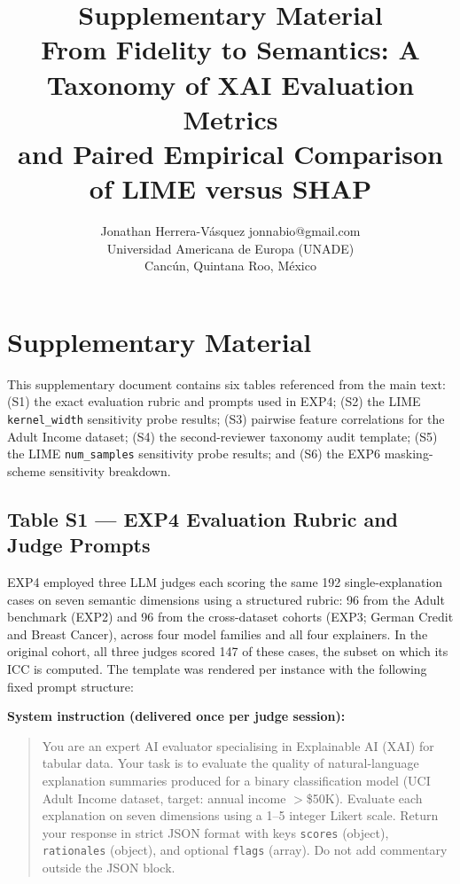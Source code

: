 \documentclass[10pt]{article}
\title{Supplementary Material\\
From Fidelity to Semantics: A Taxonomy of XAI Evaluation Metrics\\
and Paired Empirical Comparison of LIME versus SHAP}
\author{
\name Jonathan Herrera-V\'asquez \email jonnabio@gmail.com \\
\addr Universidad Americana de Europa (UNADE)\\
Canc\'un, Quintana Roo, M\'exico
}
\begin{document}
\maketitle

\appendix

\section*{Supplementary Material}
\label{sec:supplementary}

This supplementary document contains six tables referenced from the main
text: (S1) the exact evaluation rubric and prompts used in EXP4; (S2) the
LIME \texttt{kernel\_width} sensitivity probe results; (S3) pairwise
feature correlations for the Adult Income dataset; (S4) the
second-reviewer taxonomy audit template; (S5) the LIME \texttt{num\_samples}
sensitivity probe results; and (S6) the EXP6 masking-scheme sensitivity
breakdown.

\subsection*{Table S1 --- EXP4 Evaluation Rubric and Judge Prompts}
\label{sec:supp_exp4_rubric}

EXP4 employed three LLM judges each scoring the same 192 single-explanation
cases on seven semantic dimensions using a structured rubric: 96 from the
Adult benchmark (EXP2) and 96 from the cross-dataset cohorts (EXP3; German
Credit and Breast Cancer), across four model families and all four explainers.
In the original cohort, all three judges scored 147 of these cases, the
subset on which its ICC is computed.
The template was rendered per instance with the following fixed prompt
structure:

\medskip
\noindent\textbf{System instruction (delivered once per judge session):}
\begin{quote}\small
You are an expert AI evaluator specialising in Explainable AI (XAI) for
tabular data. Your task is to evaluate the quality of natural-language
explanation summaries produced for a binary classification model
(UCI Adult Income dataset, target: annual income $>$\$50K). Evaluate each
explanation on seven dimensions using a 1--5 integer Likert scale. Return
your response in strict JSON format with keys \texttt{scores} (object),
\texttt{rationales} (object), and optional \texttt{flags} (array). Do not
add commentary outside the JSON block.
\end{quote}
\end{document}

